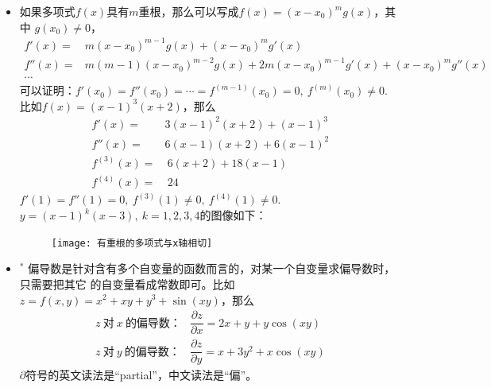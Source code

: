 \begin{itemize}[leftmargin=\inteval{\myitemleftmargin}pt,itemsep=
   \inteval{\myitemitempsep}pt,topsep=\inteval{\myitemtopsep}pt]
举几个例子，$ \ln\ln x <\ln x \ (x>1) $，$ \ln\ln x $符合(I),(II)，
但不符合(III)，而且$ \ln\ln x $比$ \ln x $更加复杂，不适合用于缩放。
$ \dfrac{2(x-1)}{x+1}<\ln x\ (x>1) $，$ \dfrac{2(x-1)}{x+1} $符合
(I),(III)，但不符合(II). 

\item 如果多项式$ f(x) $具有$ m $重根，那么可以写成$ f(x)=(x-x_0)^mg(x) $，其中
$ g(x_0)\neq 0 $，
\begin{align*}
    f'(x)=&m(x-x_0)^{m-1}g(x)+(x-x_0)^mg'(x) \\
    f''(x)=&m(m-1)(x-x_0)^{m-2}g(x)+2m(x-x_0)^{m-1}g'(x)+(x-x_0)^mg''(x) \\
    \cdots
\end{align*}
可以证明：$ f'(x_0)=f''(x_0)=\cdots=f^{(m-1)}(x_0)=0,\ f^{(m)}(x_0)\neq 0 $. \\
比如$ f(x)=(x-1)^3(x+2) $，那么
\begin{align*}
    f'(x) =&3(x-1)^2(x+2)+(x-1)^3 \\
    f''(x)=&6(x-1)(x+2)+6(x-1)^2 \\
    f^{(3)}(x) =&\ 6(x+2)+18(x-1) \\
    f^{(4)}(x) =&\ 24
\end{align*}
$ f'(1)=f''(1)=0,\ f^{(3)}(1)\neq 0,\ f^{(4)}(1)\neq 0 $. \\
$ y=(x-1)^k(x-3),\ k=1,2,3,4 $的图像如下：
\begin{figure}[!htbp]
    \centering
    \texttt{[image: 有重根的多项式与x轴相切]}
\end{figure}

\item $^*$ 偏导数是针对含有多个自变量的函数而言的，对某一个自变量求偏导数时，只需要把其它
的自变量看成常数即可。比如$ z=f(x,y)=x^2+xy+y^3+\sin(xy) $，那么
\begin{align*}
    z\ \text{对}\ x\ \text{的偏导数：} &\dfrac{\partial z}{\partial x}=
     2x+y+y\cos(xy) \\
    z\ \text{对}\ y\ \text{的偏导数：} &\dfrac{\partial z}{\partial y}= 
     x+3y^2+x\cos(xy)
\end{align*} 
$ \partial $符号的英文读法是“partial”，中文读法是“偏”。


\end{itemize}
